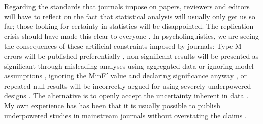 \documentclass{ar-1col}\usepackage[]{graphicx}\usepackage[]{color}
\begin{document}
Regarding the standards that journals impose on papers, reviewers and editors will have to reflect on the fact that statistical analysis will usually only get us so far; those looking for certainty in statistics will be disappointed. The replication crisis should have made this clear to everyone \citep{open2015estimating}. In psycholinguistics, we are seeing the consequences of these artificial constraints imposed by journals: Type M errors will be published preferentially \citep[e.g.,][]{levy2013expectation}, non-significant results will be presented as significant through misleading analyses using aggregated data or ignoring model assumptions \citep[e.g.,][]{hsiao03,gibsonwu}, ignoring the MinF$'$ value and declaring significance anyway \citep[e.g.,][]{vandykemcelree06,fedorenko2006nature}, or repeated null results will be incorrectly argued for using severely underpowered designs \citep[e.g.,][]{vasishthlewisLanguage05}.  The alternative is to openly accept the uncertainty inherent in data \citep{VasishthGelman2021}. My own experience has has been that it is usually possible to publish underpowered studies in mainstream journals without overstating the claims \citep[e.g.,][]{NicenboimEtAlCogSci2018,VasishthMertzenJaegerGelman2018,JaegerMertzenVanDykeVasishth2019,NicenboimPreactivation2019,ALV2019,LissonEtAl2021}. 

\end{document}
